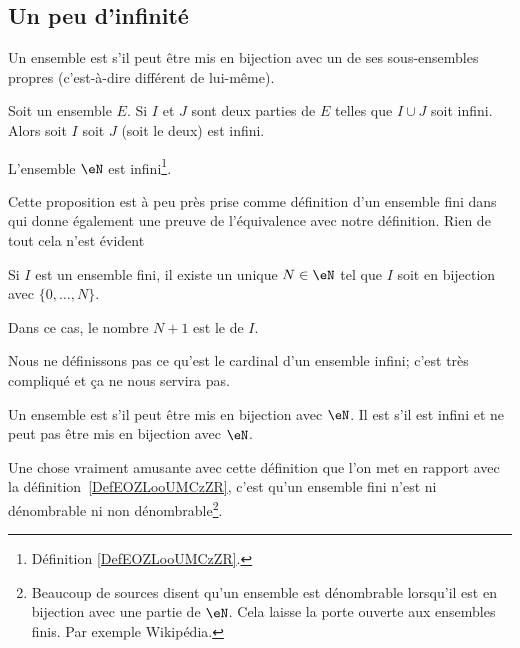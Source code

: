 \subsection{Un peu d'infinité}

\begin{definition}      \label{DefEOZLooUMCzZR}
    Un ensemble est  s'il peut être mis en bijection avec un de ses sous-ensembles propres (c'est-à-dire différent de lui-même).
\end{definition}

\begin{lemma}       \label{LEMooYHGCooAwsVQN}
    Soit un ensemble \( E\). Si \( I\) et \( J\) sont deux parties de \( E\) telles que \( I\cup J\) soit infini. Alors soit \( I\) soit \( J\) (soit le deux) est infini.
\end{lemma}

\begin{proposition}     \label{PROPooBYKCooGDkfWy}
    L'ensemble \( \eN\) est infini\footnote{Définition \ref{DefEOZLooUMCzZR}.}.
\end{proposition}

Cette proposition est à peu près prise comme définition d'un ensemble fini dans \cite{ooVAYLooJxVYex} qui donne également une preuve de l'équivalence avec notre définition. Rien de tout cela n'est évident
\begin{propositionDef}     \label{PROPooJLGKooDCcnWi}
    Si \( I\) est un ensemble fini, il existe un unique \( N\in \eN\) tel que \( I\) soit en bijection avec \( \{ 0,\ldots, N \}\).

    Dans ce cas, le nombre \( N+1\) est le  de \( I\). 
\end{propositionDef}

Nous ne définissons pas ce qu'est le cardinal d'un ensemble infini; c'est très compliqué et ça ne nous servira pas.

\begin{definition}\label{DefEnsembleDenombrable}
    Un ensemble est  s'il peut être mis en bijection avec \( \eN\). Il est  s'il est infini et ne peut pas être mis en bijection avec \( \eN\).
\end{definition}
Une chose vraiment amusante avec cette définition que l'on met en rapport avec la définition~\ref{DefEOZLooUMCzZR}, c'est qu'un ensemble fini n'est ni dénombrable ni non dénombrable\footnote{Beaucoup de sources disent qu'un ensemble est dénombrable lorsqu'il est en bijection avec une partie de \( \eN\). Cela laisse la porte ouverte aux ensembles finis. Par exemple Wikipédia\cite{ooLMVKooUiQUtb}.}.

